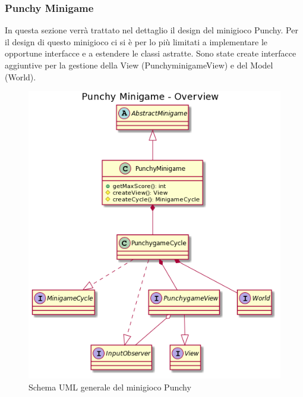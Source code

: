 \documentclass[a4paper,12pt]{report}
\begin{document}
	\subsubsection{Punchy Minigame}
	In questa sezione verrà trattato nel dettaglio il design del minigioco Punchy.\newline
	\newline
	Per il design di questo minigioco ci si è per lo più limitati a implementare le opportune interfacce e a estendere le classi astratte.
    Sono state create interfacce aggiuntive per la gestione della View (PunchyminigameView) e del Model (World).
    \begin{figure}[!t]
        \centering{}
        \includegraphics{images/picchiotti/punchyoverview.png}
        \caption{Schema UML generale del minigioco Punchy}
        \label{img:punchyoverview}
    \end{figure}
\end{document}
